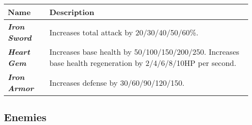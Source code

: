 \documentclass[10pt, a4paper]{article}
\begin{document}
  	\begin{center}
  	\begin{supertabular}{p{2.7cm}p{5.5cm}}
  		\hline
  		\textbf{Name}                & \textbf{Description}                                                                                 \\ \hline
  		\textit{\textbf{Iron Sword}} & Increases total attack by 20/30/40/50/60\%.                                                          \\
  		\textit{\textbf{Heart Gem}}  & Increases base health by 50/100/150/200/250. Increases base health regeneration by 2/4/6/8/10HP per second. \\
  		\textit{\textbf{Iron Armor}}  & Increases defense by 30/60/90/120/150. \\ \hline
  	\end{supertabular}
  	\end{center}
  	
  	\subsection{Enemies} \label{Enemies}
  	
\end{document}

